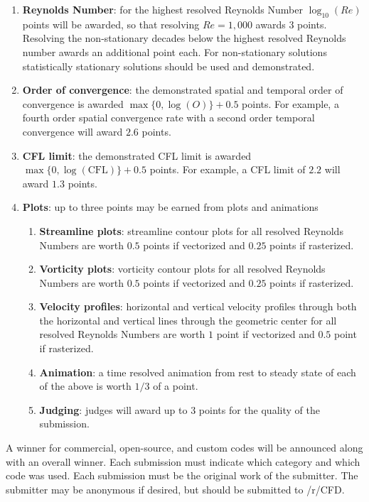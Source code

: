 \documentclass[]{article}
\begin{document}
\begin{enumerate}
\item \textbf{Reynolds Number}: for the highest resolved Reynolds Number $\log_{10}(Re)$ points will be awarded, so that resolving $Re = 1,000$ awards $3$ points.
Resolving the non-stationary decades below the highest resolved Reynolds number awards an additional point each.
For non-stationary solutions statistically stationary solutions should be used and demonstrated.

\item \textbf{Order of convergence}: the demonstrated spatial and temporal order of convergence is awarded $\max\{0,\log(O)\}+0.5$ points.  
For example, a fourth order spatial convergence rate with a second order temporal convergence will award $2.6$ points.

\item \textbf{CFL limit}: the demonstrated CFL limit is awarded $\max\{0,\log(\text{CFL})\}+0.5$ points.  
For example, a CFL limit of $2.2$ will award $1.3$ points.

\item \textbf{Plots}: up to three points may be earned from plots and animations
	
	\begin{enumerate}
		\item \textbf{Streamline plots}: streamline contour plots for all resolved Reynolds Numbers are worth $0.5$ points if vectorized and $0.25$ points if rasterized.
		
		\item \textbf{Vorticity plots}: vorticity contour plots for all resolved Reynolds Numbers are worth $0.5$ points if vectorized and $0.25$ points if rasterized.
		
		\item \textbf{Velocity profiles}: horizontal and vertical velocity profiles through both the horizontal and vertical lines through the geometric center for all resolved Reynolds Numbers are worth $1$ point if vectorized and $0.5$ point if rasterized.
		
		\item \textbf{Animation}: a time resolved animation from rest to steady state of each of the above is worth $1/3$ of a point.
		
		\item \textbf{Judging}: judges will award up to $3$ points for the quality of the submission.
	\end{enumerate}


\end{enumerate}

A winner for commercial, open-source, and custom codes will be announced along with an overall winner.
Each submission must indicate which category and which code was used.
Each submission must be the original work of the submitter.
The submitter may be anonymous if desired, but should be submitted to /r/CFD.
\end{document}
